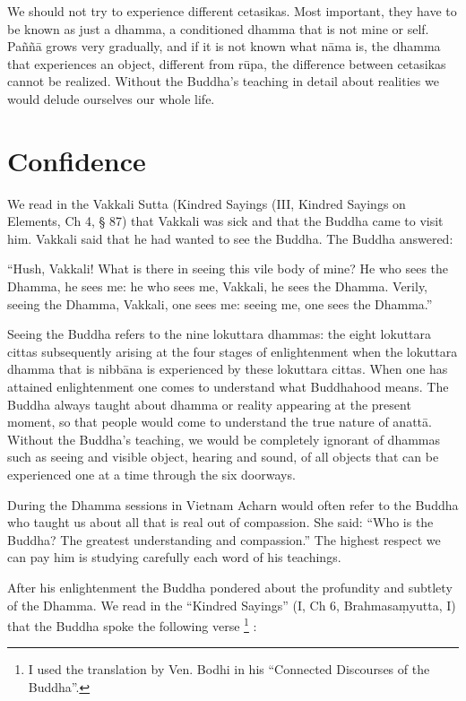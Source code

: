 {{{{{{{{{{{We should not try to experience
different cetasikas. Most important, they have to be known as just a
dhamma, a conditioned dhamma that is not mine or self. Paññā grows very
gradually, and if it is not known what nāma is, the dhamma that
experiences an object, different from rūpa, the difference between
cetasikas cannot be realized. Without the Buddha's teaching in detail
about realities we would delude ourselves our whole life.




\chapter{Confidence}

We read in the Vakkali Sutta (Kindred
Sayings (III, Kindred Sayings on Elements, Ch 4, § 87) that Vakkali was
sick and that the Buddha came to visit him. Vakkali said that he had
wanted to see the Buddha. The Buddha answered:

``Hush, Vakkali! What is there in
seeing this vile body of mine? He who sees the Dhamma, he sees me: he
who sees me, Vakkali, he sees the Dhamma. Verily, seeing the Dhamma,
Vakkali, one sees me: seeing me, one sees the Dhamma.'' 

Seeing the Buddha refers to the nine
lokuttara dhammas: the eight lokuttara cittas subsequently arising at
the four stages of enlightenment when the lokuttara dhamma that is
nibbāna is experienced by these lokuttara cittas. When one has attained
enlightenment one comes to understand what Buddhahood means. The Buddha
always taught about dhamma or reality appearing at the present moment,
so that people would come to understand the true nature of anattā.
Without the Buddha's teaching, we would be completely ignorant of
dhammas such as seeing and visible object, hearing and sound, of all
objects that can be experienced one at a time through the six doorways.


During the Dhamma sessions in Vietnam
Acharn would often refer to the Buddha who taught us about all that is
real out of compassion. She said: ``Who is the Buddha? The greatest
understanding and compassion.'' The highest respect we can pay him is
studying carefully each word of his teachings. 

After his enlightenment the Buddha
pondered about the profundity and subtlety of the Dhamma. We read in the
``Kindred Sayings'' (I, Ch 6, Brahmasaṃyutta, I) that the Buddha spoke
the following verse
\footnote{I used the translation by Ven.
Bodhi in his ``Connected Discourses of the Buddha''.}
: 

}}}}}}}}}}}
